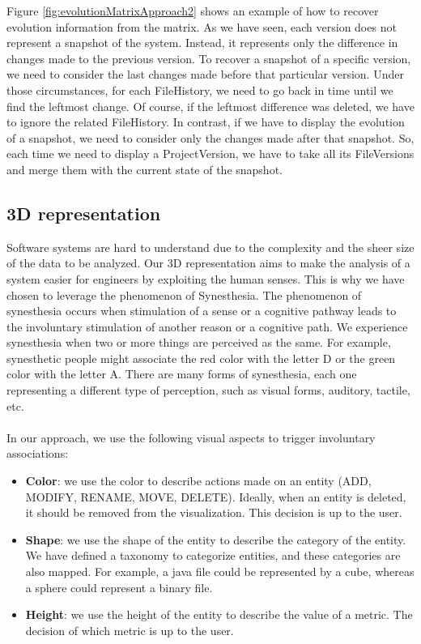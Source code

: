 Figure  \ref{fig:evolutionMatrixApproach2} shows an example of how to recover evolution information from the matrix. 
As we have seen, each version does not represent a snapshot of the system.
Instead, it represents only the difference in changes made to the previous version. 
To recover a snapshot of a specific version, we need to consider the last changes made before that particular version.
Under those circumstances, for each FileHistory, we need to go back in time until we find the leftmost change. Of course, if the leftmost difference was deleted, we have to ignore the related FileHistory.
In contrast, if we have to display the evolution of a snapshot, we need to consider only the changes made after that snapshot. 
So, each time we need to display a ProjectVersion, we have to take all its FileVersions and merge them with the current state of the snapshot. 



\subsection*{3D representation}

Software systems are hard to understand due to the complexity and the sheer size of the data to be analyzed.
Our 3D representation aims to make the analysis of a system easier for engineers by exploiting the human senses.
This is why we have chosen to leverage the phenomenon of Synesthesia.
The phenomenon of synesthesia occurs when stimulation of a sense or a cognitive pathway leads to the involuntary stimulation of another reason or a cognitive path.
We experience synesthesia when two or more things are perceived as the same. 
For example, synesthetic people might associate the red color with the letter D or the green color with the letter A. 
There are many forms of synesthesia, each one representing a different type of perception, such as visual forms, auditory, tactile, etc.\\
\\
In our approach, we use the following visual aspects to trigger involuntary associations:
\begin{itemize}
    \item \textbf{Color}: we use the color to describe actions made on an entity (ADD, MODIFY, RENAME, MOVE, DELETE). 
    Ideally, when an entity is deleted, it should be removed from the visualization. This decision is up to the user.  
    \item \textbf{Shape}: we use the shape of the entity to describe the category of the entity. 
    We have defined a taxonomy to categorize entities, and these categories are also mapped. 
    For example, a java file could be represented by a cube, whereas a sphere could represent a binary file.
    \item \textbf{Height}: we use the height of the entity to describe the value of a metric. The decision of which metric is up to the user.
\end{itemize}

